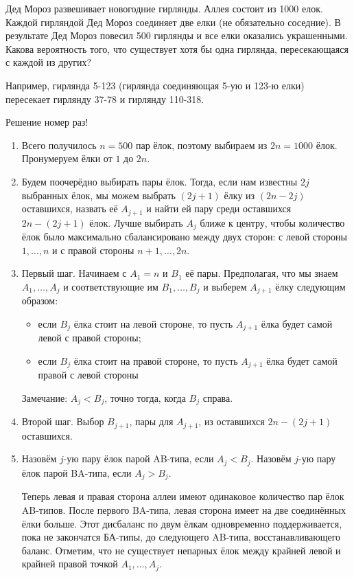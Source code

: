 \documentclass[nobib]{tufte-handout}
\theoremstyle{definition}
\newcounter{problem}
\newenvironment{problem}%
{%
\refstepcounter{problem}%
     \hypertarget{problem:{\theproblem}}{}
     \Writetofile{solution_file}{\protect\hypertarget{soln:\theproblem}{}}
     \begin{myenum}[label=\bfseries\protect\hyperlink{soln:\theproblem}{\theproblem},ref=\theproblem]
     \item%
    }%
    {%
    \end{myenum}}
\begin{document}
\begin{problem}
Дед Мороз развешивает новогодние гирлянды. Аллея состоит из 1000 елок.
Каждой гирляндой Дед Мороз соединяет две елки (не обязательно соседние).
В результате Дед Мороз повесил 500 гирлянды и все елки оказались украшенными.
Какова вероятность того, что существует хотя бы одна гирлянда,
пересекающаяся с каждой из других?

Например, гирлянда 5-123 (гирлянда соединяющая 5-ую и 123-ю елки)
пересекает гирлянду 37-78 и гирлянду 110-318.

\begin{sol}
Решение номер раз!

\begin{enumerate}
\item Всего получилось $n=500$ пар ёлок, поэтому выбираем из $2n=1000$ ёлок.
Пронумеруем ёлки от $1$ до $2n$.

\item Будем поочерёдно выбирать пары ёлок. Тогда,
если нам известны $2j$ выбранных ёлок,
мы можем выбрать $(2j+1)$ ёлку из $(2n-2j)$ оставшихся, назвать её $A_{j+1}$
и найти ей пару среди оставшихся $2n-(2j+1)$ ёлок.
Лучше выбирать $A_j$ ближе к центру, чтобы количество ёлок
было максимально сбалансировано между двух сторон:
с левой стороны ${1,\ldots ,n}$ и с правой стороны ${n+1,\ldots ,2n}$.

\item Первый шаг. Начинаем с $A_1=n$ и $B_1$ её пары.
Предполагая, что мы знаем $A_1,\ldots ,A_j$  и соответствующие им $B_1,\ldots , B_j$
и выберем $A_{j+1}$ ёлку следующим образом:
\begin{itemize}
\item если $B_j$ ёлка стоит на левой стороне,
то пусть $A_{j+1}$ ёлка будет самой левой с правой стороны;

\item если $B_j$ ёлка стоит на правой стороне,
то пусть $A_{j+1}$ ёлка будет самой правой с левой стороны
\end{itemize}
Замечание: $A_j<B_j$, точно тогда, когда $B_j$ справа.

\item Второй шаг. Выбор $B_{j+1}$, пары для $A_{j+1}$,
из оставшихся $2n-(2j+1)$ оставшихся.

\item Назовём $j$-ую пару ёлок парой AB-типа, если $A_j<B_j$.
Назовём $j$-ую пару ёлок парой BA-типа, если $A_j>B_j$.

Теперь левая и правая сторона аллеи имеют одинаковое количество пар ёлок AB-типов.
После первого BA-типа, левая сторона имеет на две соединённых ёлки больше.
Этот дисбаланс по двум ёлкам одновременно поддерживается, пока не закончатся БА-типы,
до следующего AB-типа, восстанавливающего баланс.
Отметим, что не существует непарных ёлок между крайней левой
и крайней правой точкой $A_1,\ldots ,A_j$.


\end{enumerate}
\end{sol}
\end{problem}
\end{document}
